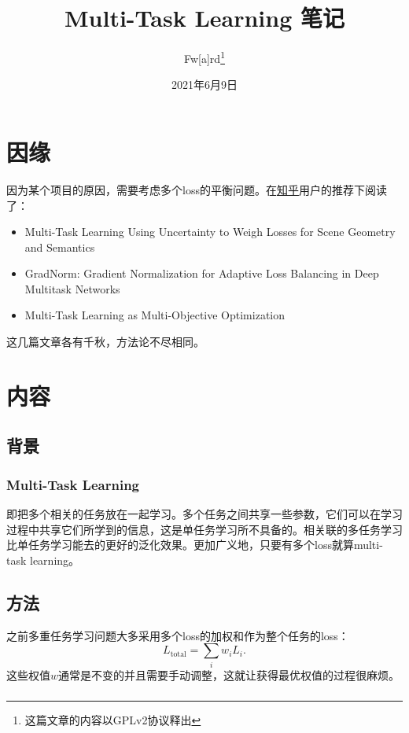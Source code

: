 \documentclass{ctexart}
\title{Multi-Task Learning 笔记}
\author{Fw[a]rd\thanks{这篇文章的内容以GPLv2协议释出}}
\date{2021年6月9日}
\begin{document}
\maketitle

\section{因缘}
因为某个项目的原因，需要考虑多个loss的平衡问题。在\href{https://www.zhihu.com/question/375794498}{知乎}用户的推荐下阅读了：

\begin{itemize}
    \item Multi-Task Learning Using Uncertainty to Weigh Losses for Scene Geometry and Semantics\cite{Kendall18Uncertainty}
    \item GradNorm: Gradient Normalization for Adaptive Loss Balancing in Deep Multitask Networks\cite{Chen18GradNorm}
    \item Multi-Task Learning as Multi-Objective Optimization\cite{Sener18Pareto}
\end{itemize}

这几篇文章各有千秋，方法论不尽相同。

\section{内容}
\subsection{背景}
\subsubsection{Multi-Task Learning}
即把多个相关的任务放在一起学习。多个任务之间共享一些参数，它们可以在学习过程中共享它们所学到的信息，这是单任务学习所不具备的。相关联的多任务学习比单任务学习能去的更好的泛化效果。更加广义地，只要有多个loss就算multi-task learning。

\subsection{方法}

之前多重任务学习问题大多采用多个loss的加权和作为整个任务的loss：
\begin{equation}
    L_\mathrm{total} = \sum_i w_iL_i.
\end{equation}
这些权值$w$通常是不变的并且需要手动调整，这就让获得最优权值的过程很麻烦。

\subsubsection{}
\end{document}
